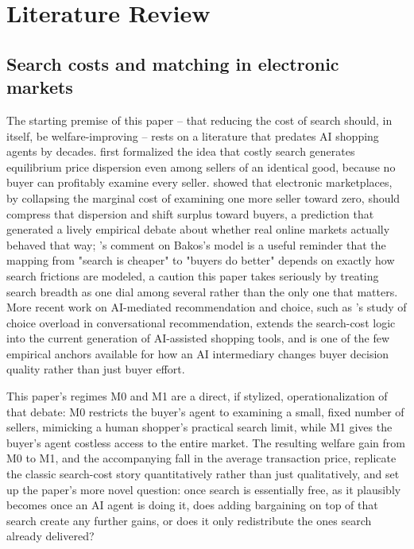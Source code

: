 \documentclass[review]{elsarticle}
\begin{document}
\section{Literature Review}

\subsection{Search costs and matching in electronic markets}

The starting premise of this paper -- that reducing the cost of search should, in itself, be welfare-improving -- rests on a literature that predates AI shopping agents by decades. \citet{stigler1961economics} first formalized the idea that costly search generates equilibrium price dispersion even among sellers of an identical good, because no buyer can profitably examine every seller. \citet{bakos1997reducing} showed that electronic marketplaces, by collapsing the marginal cost of examining one more seller toward zero, should compress that dispersion and shift surplus toward buyers, a prediction that generated a lively empirical debate about whether real online markets actually behaved that way; \citet{harrington2001comment}'s comment on Bakos's model is a useful reminder that the mapping from "search is cheaper" to "buyers do better" depends on exactly how search frictions are modeled, a caution this paper takes seriously by treating search breadth as one dial among several rather than the only one that matters. More recent work on AI-mediated recommendation and choice, such as \citet{kim2023decisions}'s study of choice overload in conversational recommendation, extends the search-cost logic into the current generation of AI-assisted shopping tools, and is one of the few empirical anchors available for how an AI intermediary changes buyer decision quality rather than just buyer effort.

This paper's regimes M0 and M1 are a direct, if stylized, operationalization of that debate: M0 restricts the buyer's agent to examining a small, fixed number of sellers, mimicking a human shopper's practical search limit, while M1 gives the buyer's agent costless access to the entire market. The resulting welfare gain from M0 to M1, and the accompanying fall in the average transaction price, replicate the classic search-cost story quantitatively rather than just qualitatively, and set up the paper's more novel question: once search is essentially free, as it plausibly becomes once an AI agent is doing it, does adding bargaining on top of that search create any further gains, or does it only redistribute the ones search already delivered?
\end{document}
